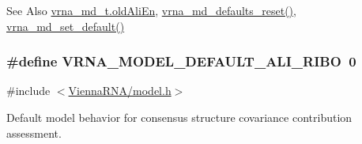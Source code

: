 \begin{DoxySeeAlso}{See Also}
\hyperlink{group__model__details_ab53aec4503130877973c6111ae6f0f76}{vrna\-\_\-md\-\_\-t.\-old\-Ali\-En}, \hyperlink{group__model__details_ga70834424cf804d149937de89f80ceb45}{vrna\-\_\-md\-\_\-defaults\-\_\-reset()}, \hyperlink{group__model__details_ga8ac6ff84936282436f822644bf841f66}{vrna\-\_\-md\-\_\-set\-\_\-default()} 
\end{DoxySeeAlso}
\hypertarget{group__model__details_ga64b3ab65a9ca42d4ad1d05e193083147}{
\subsubsection[{V\-R\-N\-A\-\_\-\-M\-O\-D\-E\-L\-\_\-\-D\-E\-F\-A\-U\-L\-T\-\_\-\-A\-L\-I\-\_\-\-R\-I\-B\-O}]{\setlength{\rightskip}{0pt plus 5cm}\#define V\-R\-N\-A\-\_\-\-M\-O\-D\-E\-L\-\_\-\-D\-E\-F\-A\-U\-L\-T\-\_\-\-A\-L\-I\-\_\-\-R\-I\-B\-O~0}}\label{group__model__details_ga64b3ab65a9ca42d4ad1d05e193083147}


{\ttfamily \#include $<$\hyperlink{model_8h}{Vienna\-R\-N\-A/model.\-h}$>$}



Default model behavior for consensus structure covariance contribution assessment. 

